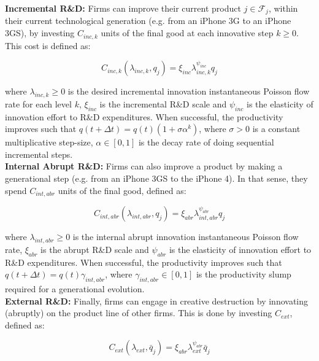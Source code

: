 \documentclass[letterpaper,12pt]{article}
\theoremstyle{definition}
\begin{document}
\textbf{Incremental R\&D:} Firms can improve their current product $j \in \mathscr{F}_j$, within their current technological generation (e.g. from an iPhone 3G to an iPhone 3GS), by investing $C_{inc,k}$ units of the final good at each innovative step $k \geq 0$. This cost is defined as:

\begin{equation} \label{eq:Cinc}
C_{inc,k}(\lambda_{inc,k},q_j) = \xi_{inc}\lambda_{inc,k}^{\psi_{inc}}q_j
\end{equation}

\noindent where $\lambda_{inc,k} \ge 0$ is the desired incremental innovation instantaneous Poisson flow rate for each level $k$, $\xi_{inc}$ is the incremental R\&D scale and $\psi_{inc}$ is the elasticity of innovation effort to R\&D expenditures. When successful, the productivity improves such that $q(t + \Delta t) = q(t)(1 + \sigma\alpha^{k})$, where $\sigma > 0$ is a constant multiplicative step-size, $\alpha \in [0, 1]$ is the decay rate of doing sequential incremental steps.\\

\textbf{Internal Abrupt R\&D:} Firms can also improve a product by making a generational step (e.g. from an iPhone 3GS to the iPhone 4). In that sense, they spend $C_{int, abr}$ units of the final good, defined as:

\begin{equation} \label{eq:Cintabr}
C_{int,abr}(\lambda_{int,abr},q_j) = \xi_{abr}\lambda_{int,abr}^{\psi_{abr}}q_j
\end{equation}

\noindent where $\lambda_{int,abr} \ge 0$ is the internal abrupt innovation instantaneous Poisson flow rate, $\xi_{abr}$ is the abrupt R\&D scale and $\psi_{abr}$ is the elasticity of innovation effort to R\&D expenditures. When successful, the productivity improves such that $q(t + \Delta t) = q(t)\gamma_{int,abr}$, where $\gamma_{int,abr} \in [0,1]$ is the productivity slump required for a generational evolution.\\

\textbf{External R\&D:} Finally, firms can engage in creative destruction by innovating (abruptly) on the product line of other firms. This is done by investing $C_{ext}$, defined as:

\begin{equation} \label{eq:Cext}
C_{ext}(\lambda_{ext},\bar{q}_j) = \xi_{abr}\lambda_{ext}^{\psi_{abr}}\bar{q}_j
\end{equation}
\end{document}
